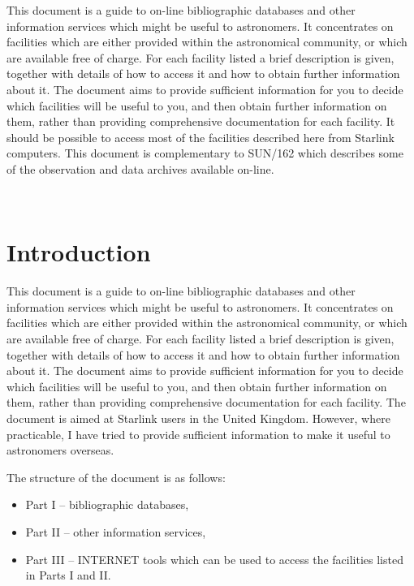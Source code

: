 \documentclass[twoside,11pt]{article}
\newcommand{\stardocinitials}  {SUN}
\newcommand{\stardocnumber}    {174.1}
\newcommand{\stardocabstract}  {
This document is a guide to on-line bibliographic databases and other
information services which might be useful to astronomers. It
concentrates on facilities which are either provided within the
astronomical community, or which are available free of charge. For
each facility listed a brief description is given, together with details
of how to access it and how to obtain further information about it.
The document aims to provide sufficient information for you to decide
which facilities will be useful to you, and then obtain further
information on them, rather than providing comprehensive documentation
for each facility. It should be possible to access most of the
facilities described here from Starlink computers. This document is
complementary to SUN/162 which describes some of the observation and
data archives available on-line.
}
\newcommand{\stardocname}{\stardocinitials /\stardocnumber}
\newenvironment{latexonly}{}{}
\newcommand{\xlabel}[1]{}
\renewcommand{\thepage}{\roman{page}}
\begin{document}
\stardocabstract
\newpage
\begin{latexonly}
   \setlength{\parskip}{0mm}
   \tableofcontents
   \setlength{\parskip}{\medskipamount}
   \markright{\stardocname}
\end{latexonly}
\newpage
~
\newpage
\renewcommand{\thepage}{\arabic{page}}
\setcounter{page}{1}

\section{Introduction\xlabel{introduction}}

This document is a guide to on-line bibliographic databases and other
information services which might be useful to astronomers. It
concentrates on facilities which are either provided within the
astronomical community, or which are available free of charge. For
each facility listed a brief description is given, together with details
of how to access it and how to obtain further information about it.
The document aims to provide sufficient information for you to decide
which facilities will be useful to you, and then obtain further
information on them, rather than providing comprehensive documentation
for each facility. The document is aimed at Starlink users in the
United Kingdom. However, where practicable, I have tried to provide
sufficient information to make it useful to astronomers overseas.

The structure of the document is as follows:

\begin{itemize}

  \item Part I -- bibliographic databases,

  \item Part II -- other information services,

  \item Part III -- INTERNET tools which can be used to access the
   facilities listed in Parts I and II.

\end{itemize}
\end{document}
